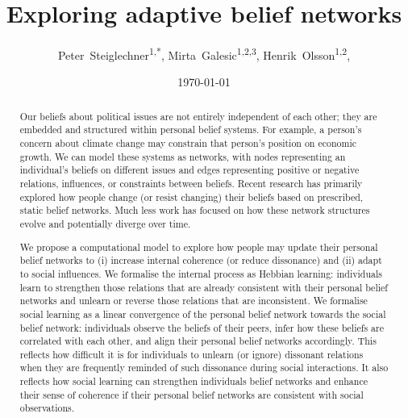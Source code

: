 \documentclass[10pt]{article}
\title{Exploring adaptive belief networks}
\author{
   Peter~Steiglechner\textsuperscript{1,*}, Mirta~Galesic\textsuperscript{1,2,3}, Henrik~Olsson\textsuperscript{1,2}, 
}
\date{\today}
\begin{document}
\maketitle


\linenumbers

\begin{abstract}
    Our beliefs about political issues are not entirely independent of each other; they are embedded and structured within personal belief systems. For example, a person's concern about climate change may constrain that person's position on economic growth. We can model these systems as networks, with nodes representing an individual's beliefs on different issues and edges representing positive or negative relations, influences, or constraints between beliefs. Recent research has primarily explored how people change (or resist changing) their beliefs based on prescribed, static belief networks. Much less work has focused on how these network structures evolve and potentially diverge over time. 

   We propose a computational model to explore how people may update their personal belief networks to (i) increase internal coherence (or reduce dissonance) and (ii) adapt to social influences. We formalise the internal process as Hebbian learning: individuals learn to strengthen those relations that are already consistent with their personal belief networks and unlearn or reverse those relations that are inconsistent. We formalise social learning as a linear convergence of the personal belief network towards the social belief network: individuals observe the beliefs of their peers, infer how these beliefs are correlated with each other, and align their personal belief networks accordingly. This reflects how difficult it is for individuals to unlearn (or ignore) dissonant relations when they are frequently reminded of such dissonance during social interactions. It also reflects how social learning can strengthen individuals belief networks and enhance their sense of coherence if their personal belief networks are consistent with social observations.


\end{abstract}
\end{document}
